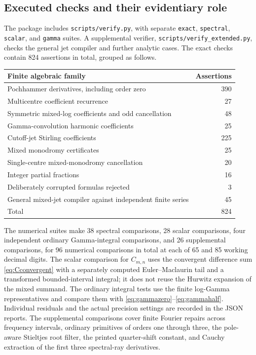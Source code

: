 \documentclass[11pt,a4paper]{article}
\numberwithin{equation}{section}
\theoremstyle{definition}\newtheorem{definition}[theorem]{Definition}
\theoremstyle{remark}\newtheorem{remark}[theorem]{Remark}
\newcommand{\pathref}[1]{\nolinkurl{#1}}
\begin{document}
\subsection{Executed checks and their evidentiary role}
The package includes \pathref{scripts/verify.py}, with separate
\texttt{exact}, \texttt{spectral}, \texttt{scalar}, and \texttt{gamma}
suites. A supplemental verifier, \pathref{scripts/verify_extended.py},
checks the general jet compiler and further analytic cases. The exact
checks contain 824 assertions in total, grouped as follows.
\begin{center}
\begin{tabular}{lr}
\toprule
Finite algebraic family & Assertions\\
\midrule
Pochhammer derivatives, including order zero &390\\
Multicentre coefficient recurrence &27\\
Symmetric mixed-log coefficients and odd cancellation &48\\
Gamma-convolution harmonic coefficients &25\\
Cutoff-jet Stirling coefficients &225\\
Mixed monodromy certificates &25\\
Single-centre mixed-monodromy cancellation &20\\
Integer partial fractions &16\\
Deliberately corrupted formulas rejected &3\\
General mixed-jet compiler against independent finite series &45\\
\midrule
Total &824\\
\bottomrule
\end{tabular}
\end{center}
The numerical suites make 38 spectral comparisons, 28 scalar
comparisons, four independent ordinary Gamma-integral comparisons, and
26 supplemental comparisons, for 96 numerical comparisons in total at
each of 65 and 85 working decimal digits.
The scalar comparison for $C_{m,n}$ uses the convergent difference sum
\eqref{eq:Cconvergent} with a separately computed Euler--Maclaurin
tail and a transformed bounded-interval integral; it does not reuse the
Hurwitz expansion of the mixed summand. The ordinary integral tests
use the finite log-Gamma representatives and compare them with
\eqref{eq:gammazero}--\eqref{eq:gammahalf}. Individual residuals and
the actual precision settings are recorded in the JSON reports.
The supplemental comparisons cover finite Fourier repairs across frequency
intervals, ordinary primitives of orders one through three, the pole-aware
Stieltjes root filter, the printed quarter-shift constant, and Cauchy
extraction of the first three spectral-ray derivatives.
\end{document}
